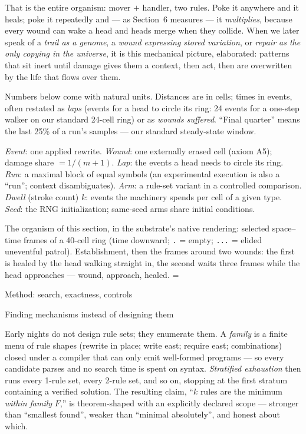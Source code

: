 That is the entire organism: mover $+$ handler, two rules. Poke it
anywhere and it heals; poke it repeatedly and --- as Section~6
measures --- it {\it multiplies}, because every wound can wake a
head and heads merge when they collide. When we later speak of a
{\it trail as a genome}, a {\it wound expressing stored variation},
or {\it repair as the only copying in the universe}, it is this
mechanical picture, elaborated: patterns that sit inert until
damage gives them a context, then act, then are overwritten by the
life that flows over them.

Numbers below come with natural units. Distances are in cells;
times in events, often restated as {\it laps} (events for a head to
circle its ring: 24 events for a one-step walker on our standard
24-cell ring) or as {\it wounds suffered}. “Final quarter” means
the last 25\% of a run's samples --- our standard steady-state
window.

\medskip
{} {\it Event}: one applied rewrite.
{\it Wound}: one externally erased cell (axiom A5); damage share
$=1/(m{+}1)$. {\it Lap}: the events a head needs to circle its
ring. {\it Run}: a maximal block of equal symbols (an experimental
execution is also a “run”; context disambiguates). {\it Arm}: a
rule-set variant in a controlled comparison. {\it Dwell} (stroke
count) $k$: events the machinery spends per cell of a given type.
{\it Seed}: the RNG initialization; same-seed arms share initial
conditions.

\medskip
{} The organism of this section, in the
substrate's native rendering: selected space--time frames of a
40-cell ring (time downward; {\tt .} = empty; {\tt ...} = elided
uneventful patrol). Establishment, then the frames around two
wounds: the first is healed by the head walking straight in, the
second waits three frames while the head approaches --- wound,
approach, healed.
\begingroup\everytt={\typosize[8/9.2]}

\endgroup

\sec Method: search, exactness, controls

\secc Finding mechanisms instead of designing them

Early nights do not design rule sets; they enumerate them. A {\it
family} is a finite menu of rule shapes (rewrite in place; write
east; require east; combinations) closed under a compiler that can
only emit well-formed programs --- so every candidate parses and no
search time is spent on syntax. {\it Stratified exhaustion} then
runs every 1-rule set, every 2-rule set, and so on, stopping at the
first stratum containing a verified solution. The resulting claim,
“$k$ rules are the minimum {\it within family} $F$,” is
theorem-shaped with an explicitly declared scope --- stronger than
“smallest found”, weaker than “minimal absolutely”, and honest
about which.

